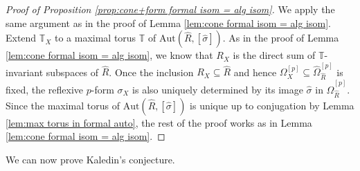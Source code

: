\documentclass[12pt]{amsart}
\theoremstyle{definition}
\newcommand{\bT}{\mathbb{T}}
\newcommand{\Aut}{\mathrm{Aut}}
\numberwithin{equation}{section}
\begin{document}
\begin{proof}[Proof of Proposition \ref{prop:cone+form formal isom = alg isom}]
We apply the same argument as in the proof of Lemma \ref{lem:cone formal isom = alg isom}. Extend $\bT_X$ to a maximal torus $\bT$ of $\Aut(\widehat{R},[\widehat{\sigma}])$. As in the proof of Lemma \ref{lem:cone formal isom = alg isom}, we know that $R_X$ is the direct sum of $\bT$-invariant subspaces of $\widehat{R}$. Once the inclusion $R_X\subseteq \widehat{R}$ and hence $\Omega_X^{[p]}\subseteq \widehat{\Omega}_{\widehat{R}}^{[p]}$ is fixed, the reflexive $p$-form $\sigma_X$ is also uniquely determined by its image $\widehat{\sigma}$ in $\widehat{\Omega}_{\widehat{R}}^{[p]}$. Since the maximal torus of $\Aut(\widehat{R},[\widehat{\sigma}])$ is unique up to conjugation by Lemma \ref{lem:max torus in formal auto}, the rest of the proof works as in Lemma \ref{lem:cone formal isom = alg isom}.
\end{proof}

We can now prove Kaledin's conjecture.
\end{document}
